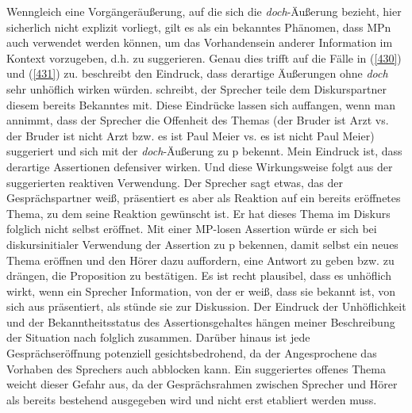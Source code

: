 Wenngleich eine Vorgängeräußerung, auf die sich die \textit{doch}-Äußerung bezieht, hier sicherlich nicht explizit vorliegt, gilt es als ein bekanntes Phänomen, dass MPn auch verwendet werden können, um das Vorhandensein anderer Information im Kontext vorzugeben, d.h. zu suggerieren. Genau dies trifft auf die Fälle in (\ref{430}) und (\ref{431}) zu. \citet[Fn 14]{Repp2013} beschreibt den Eindruck, dass derartige Äußerungen ohne \textit{doch} sehr unhöflich wirken würden. \citet[138]{Egg2013} schreibt, der Sprecher teile dem Diskurspartner diesem bereits Bekanntes mit. Diese Eindrücke lassen sich auffangen, wenn man annimmt, dass der Sprecher die Offenheit des Themas (der Bruder ist Arzt vs. der Bruder ist nicht Arzt bzw. es ist Paul Meier vs. es ist nicht Paul Meier) suggeriert und sich mit der \textit{doch}-Äußerung zu p bekennt. Mein Eindruck ist, dass derartige Assertionen defensiver wirken. Und diese Wirkungsweise folgt aus der suggerierten reaktiven Verwendung. Der Sprecher sagt etwas, das der Gesprächspartner weiß, präsentiert es aber als Reaktion auf ein bereits eröffnetes Thema, zu dem seine Reaktion gewünscht ist. Er hat dieses Thema im Diskurs folglich nicht selbst eröffnet. Mit einer MP-losen Assertion würde er sich bei diskursinitialer Verwendung der Assertion zu p bekennen, damit selbst ein neues Thema eröffnen und den Hörer dazu auffordern, eine Antwort zu geben bzw. zu drängen, die Proposition zu bestätigen. Es ist recht plausibel, dass es unhöflich wirkt, wenn ein Sprecher Information, von der er weiß, dass sie bekannt ist, von sich aus präsentiert, als stünde sie zur Diskussion. Der Eindruck der Unhöflichkeit und der Bekanntheitsstatus des Asser\-tionsgehaltes hängen meiner Beschreibung der Situation nach folglich zusammen. Darüber hinaus ist jede Gesprächseröffnung potenziell gesichtsbedrohend, da der Angesprochene das Vorhaben des Sprechers auch abblocken kann. Ein suggeriertes offenes Thema weicht dieser Gefahr aus, da der Gesprächsrahmen zwischen Sprecher und Hörer als bereits bestehend ausgegeben wird und nicht erst etabliert werden muss.

